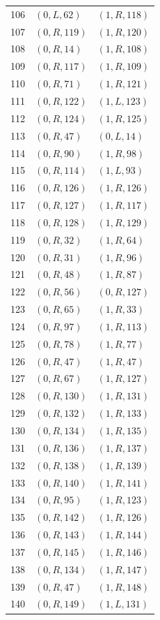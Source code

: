 \begin{longtable}{rll}
106 & $(0,L,62)$ & $(1,R,118)$ \\
107 & $(0,R,119)$ & $(1,R,120)$ \\
108 & $(0,R,14)$ & $(1,R,108)$ \\
109 & $(0,R,117)$ & $(1,R,109)$ \\
110 & $(0,R,71)$ & $(1,R,121)$ \\
111 & $(0,R,122)$ & $(1,L,123)$ \\
112 & $(0,R,124)$ & $(1,R,125)$ \\
113 & $(0,R,47)$ & $(0,L,14)$ \\
114 & $(0,R,90)$ & $(1,R,98)$ \\
115 & $(0,R,114)$ & $(1,L,93)$ \\
116 & $(0,R,126)$ & $(1,R,126)$ \\
117 & $(0,R,127)$ & $(1,R,117)$ \\
118 & $(0,R,128)$ & $(1,R,129)$ \\
119 & $(0,R,32)$ & $(1,R,64)$ \\
120 & $(0,R,31)$ & $(1,R,96)$ \\
121 & $(0,R,48)$ & $(1,R,87)$ \\
122 & $(0,R,56)$ & $(0,R,127)$ \\
123 & $(0,R,65)$ & $(1,R,33)$ \\
124 & $(0,R,97)$ & $(1,R,113)$ \\
125 & $(0,R,78)$ & $(1,R,77)$ \\
126 & $(0,R,47)$ & $(1,R,47)$ \\
127 & $(0,R,67)$ & $(1,R,127)$ \\
128 & $(0,R,130)$ & $(1,R,131)$ \\
129 & $(0,R,132)$ & $(1,R,133)$ \\
130 & $(0,R,134)$ & $(1,R,135)$ \\
131 & $(0,R,136)$ & $(1,R,137)$ \\
132 & $(0,R,138)$ & $(1,R,139)$ \\
133 & $(0,R,140)$ & $(1,R,141)$ \\
134 & $(0,R,95)$ & $(1,R,123)$ \\
135 & $(0,R,142)$ & $(1,R,126)$ \\
136 & $(0,R,143)$ & $(1,R,144)$ \\
137 & $(0,R,145)$ & $(1,R,146)$ \\
138 & $(0,R,134)$ & $(1,R,147)$ \\
139 & $(0,R,47)$ & $(1,R,148)$ \\
140 & $(0,R,149)$ & $(1,L,131)$ \\

\end{longtable}
